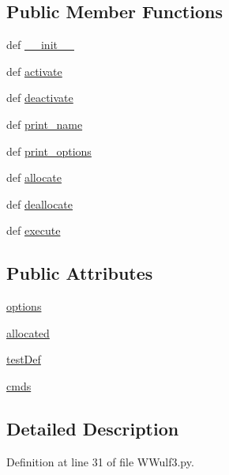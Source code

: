 \subsection*{Public Member Functions}
\begin{DoxyCompactItemize}
\item 
def \hyperlink{classWWulf3_1_1WWulf3_a796bd38c05021cfe1058ece9a27a2df4}{\-\_\-\-\_\-init\-\_\-\-\_\-}
\item 
def \hyperlink{classWWulf3_1_1WWulf3_ae3ed31bec61b4caf00f9f96f6e05ffa1}{activate}
\item 
def \hyperlink{classWWulf3_1_1WWulf3_a3eafeb23e8b080a556a9817b93092c18}{deactivate}
\item 
def \hyperlink{classWWulf3_1_1WWulf3_a9054ae7fc728370cdbf0fc3521332e49}{print\-\_\-name}
\item 
def \hyperlink{classWWulf3_1_1WWulf3_ae507b747f83b985ee062daecc9538f17}{print\-\_\-options}
\item 
def \hyperlink{classWWulf3_1_1WWulf3_a190419acb6dae4278ac923171e0f16e8}{allocate}
\item 
def \hyperlink{classWWulf3_1_1WWulf3_aeeedd5c98d7ed91c4f0beb92a19e23bb}{deallocate}
\item 
def \hyperlink{classWWulf3_1_1WWulf3_a2320c2c37a10d678a6d35ffab6096385}{execute}
\end{DoxyCompactItemize}
\subsection*{Public Attributes}
\begin{DoxyCompactItemize}
\item 
\hyperlink{classWWulf3_1_1WWulf3_adff5ffd43f8b68d49c7b45ab48d7b428}{options}
\item 
\hyperlink{classWWulf3_1_1WWulf3_ad83bab03cfcdab3a5b689a0958db19e8}{allocated}
\item 
\hyperlink{classWWulf3_1_1WWulf3_a9e8732432df9211bd64454c4c0e04098}{test\-Def}
\item 
\hyperlink{classWWulf3_1_1WWulf3_afb4fb9db2456e29872155d9b8738418f}{cmds}
\end{DoxyCompactItemize}


\subsection{Detailed Description}


Definition at line 31 of file W\-Wulf3.\-py.




